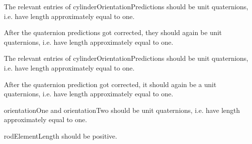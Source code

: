 
\begin{DoxyRefList}
\item[Member \mbox{\hyperlink{class_guidewire_sim_1_1_constraint_solving_step_ab6b120bcd38837fdbca8d65aa4887bdc}{Guidewire\+Sim.Constraint\+Solving\+Step.Correct\+Bend\+Twist\+Predictions}} (int cylinder\+Index, BSM.\+Quaternion\mbox{[}\mbox{]} cylinder\+Orientation\+Predictions)]\label{requirement__requirement000010}%
%
 The relevant entries of {\ttfamily cylinder\+Orientation\+Predictions} should be unit quaternions, i.\+e. have length approximately equal to one. 



After the quaternion predictions got corrected, they should again be unit quaternions, i.\+e. have length approximately equal to one.  
\item[Member \mbox{\hyperlink{class_guidewire_sim_1_1_constraint_solving_step_af46d12dac6f136ceb5ae96bcc2f488fa}{Guidewire\+Sim.Constraint\+Solving\+Step.Correct\+Stretch\+Predictions}} (int sphere\+Index, Vector3\mbox{[}\mbox{]} sphere\+Position\+Predictions, BSM.\+Quaternion\mbox{[}\mbox{]} cylinder\+Orientation\+Predictions)]\label{requirement__requirement000009}%
%
 The relevant entries of {\ttfamily cylinder\+Orientation\+Predictions} should be unit quaternions, i.\+e. have length approximately equal to one. 



After the quaternion prediction got corrected, it should again be a unit quaternions, i.\+e. have length approximately equal to one.  
\item[Member \mbox{\hyperlink{class_guidewire_sim_1_1_constraint_solving_step_abb927153b912de1947c243c754bc7420}{Guidewire\+Sim.Constraint\+Solving\+Step.Solve\+Bend\+Twist\+Constraint}} (BSM.\+Quaternion orientation\+One, BSM.\+Quaternion orientation\+Two, Vector3 discrete\+Rest\+Darboux\+Vector, float rod\+Element\+Length, out BSM.\+Quaternion delta\+Orientation\+One, out BSM.\+Quaternion delta\+Orientation\+Two, float inertia\+Weight\+One=1f, float inertia\+Weight\+Two=1f)]\label{requirement__requirement000008}%
%
 {\ttfamily orientation\+One} and {\ttfamily orientation\+Two} should be unit quaternions, i.\+e. have length approximately equal to one. 



{\ttfamily rod\+Element\+Length} should be positive. 




\end{DoxyRefList}

